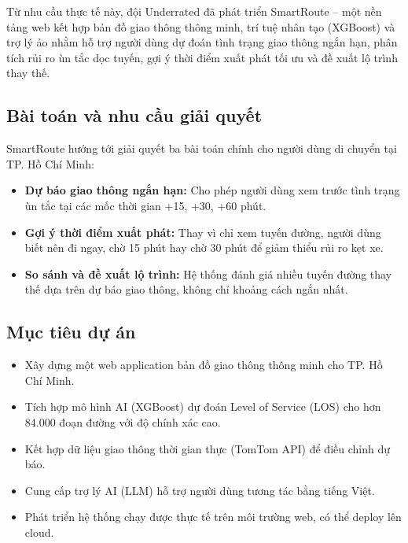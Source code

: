 \documentclass[12pt,a4paper]{article}
\begin{document}
Từ nhu cầu thực tế này, đội Underrated đã phát triển SmartRoute -- một nền tảng web kết hợp bản đồ giao thông thông minh, trí tuệ nhân tạo (XGBoost) và trợ lý ảo nhằm hỗ trợ người dùng dự đoán tình trạng giao thông ngắn hạn, phân tích rủi ro ùn tắc dọc tuyến, gợi ý thời điểm xuất phát tối ưu và đề xuất lộ trình thay thế.

\subsection{Bài toán và nhu cầu giải quyết}
SmartRoute hướng tới giải quyết ba bài toán chính cho người dùng di chuyển tại TP. Hồ Chí Minh:
\begin{itemize}[leftmargin=1.2cm]
    \item \textbf{Dự báo giao thông ngắn hạn:} Cho phép người dùng xem trước tình trạng ùn tắc tại các mốc thời gian +15, +30, +60 phút.
    \item \textbf{Gợi ý thời điểm xuất phát:} Thay vì chỉ xem tuyến đường, người dùng biết nên đi ngay, chờ 15 phút hay chờ 30 phút để giảm thiểu rủi ro kẹt xe.
    \item \textbf{So sánh và đề xuất lộ trình:} Hệ thống đánh giá nhiều tuyến đường thay thế dựa trên dự báo giao thông, không chỉ khoảng cách ngắn nhất.
\end{itemize}

\subsection{Mục tiêu dự án}
\begin{itemize}[leftmargin=1.2cm]
    \item Xây dựng một web application bản đồ giao thông thông minh cho TP. Hồ Chí Minh.
    \item Tích hợp mô hình AI (XGBoost) dự đoán Level of Service (LOS) cho hơn 84.000 đoạn đường với độ chính xác cao.
    \item Kết hợp dữ liệu giao thông thời gian thực (TomTom API) để điều chỉnh dự báo.
    \item Cung cấp trợ lý AI (LLM) hỗ trợ người dùng tương tác bằng tiếng Việt.
    \item Phát triển hệ thống chạy được thực tế trên môi trường web, có thể deploy lên cloud.
\end{itemize}
\end{document}
